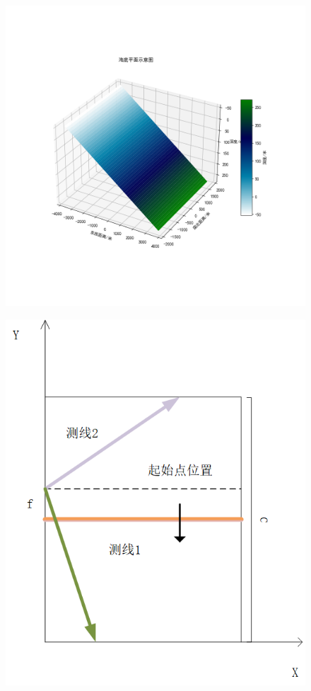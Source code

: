 \documentclass[withoutpreface,bwprint]{cumcmthesis} %
\begin{document}
 
   \begin{figure}[htbp]
    \centering
    \begin{minipage}[c]{0.48\textwidth}
        \centering
        \includegraphics[height=0.3\textheight]{海底图.png}
        \label{16}
    \end{minipage}
    \begin{minipage}[c]{0.48\textwidth}
        \centering
        \includegraphics[height=0.3\textheight]{第三问2.png}

\end{minipage}
\end{figure}
\end{document}
